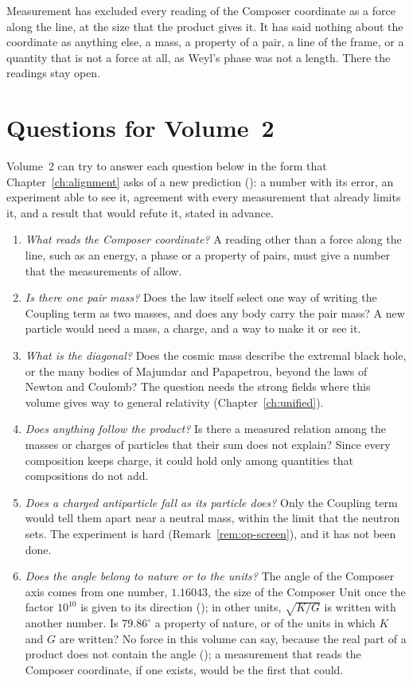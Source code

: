 Measurement has excluded every reading of the Composer coordinate as a force along the line, at the size that the product gives it. It has said nothing about the coordinate as anything else, a mass, a property of a pair, a line of the frame, or a quantity that is not a force at all, as Weyl's phase was not a length. There the readings stay open.

\section{Questions for Volume~2}\label{sec:op-questions}

Volume~2 can try to answer each question below in the form that Chapter~\ref{ch:alignment} asks of a new prediction (): a number with its error, an experiment able to see it, agreement with every measurement that already limits it, and a result that would refute it, stated in advance.
\begin{enumerate}
  \item \emph{What reads the Composer coordinate?} A reading other than a force along the line, such as an energy, a phase or a property of pairs, must give a number that the measurements of  allow.
  \item \emph{Is there one pair mass?} Does the law itself select one way of writing the Coupling term as two masses, and does any body carry the pair mass? A new particle would need a mass, a charge, and a way to make it or see it.
  \item \emph{What is the diagonal?} Does the cosmic mass describe the extremal black hole, or the many bodies of Majumdar and Papapetrou, beyond the laws of Newton and Coulomb? The question needs the strong fields where this volume gives way to general relativity (Chapter~\ref{ch:unified}).
  \item \emph{Does anything follow the product?} Is there a measured relation among the masses or charges of particles that their sum does not explain? Since every composition keeps charge, it could hold only among quantities that compositions do not add.
  \item \emph{Does a charged antiparticle fall as its particle does?} Only the Coupling term would tell them apart near a neutral mass, within the limit that the neutron sets. The experiment is hard (Remark~\ref{rem:op-screen}), and it has not been done.
  \item \emph{Does the angle belong to nature or to the units?} The angle of the Composer axis comes from one number, $1.16043$, the size of the Composer Unit once the factor $10^{10}$ is given to its direction (); in other units, $\sqrt{K/G}$ is written with another number. Is $79.86^\circ$ a property of nature, or of the units in which $K$ and $G$ are written? No force in this volume can say, because the real part of a product does not contain the angle (); a measurement that reads the Composer coordinate, if one exists, would be the first that could.
\end{enumerate}

